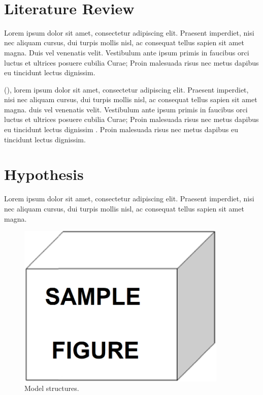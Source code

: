 \vfill\phantom{.}\\

\section{Literature Review}\label{literaturereview}

Lorem ipsum dolor sit amet, consectetur adipiscing elit. Praesent imperdiet, nisi nec aliquam cursus, dui turpis mollis nisl, ac consequat tellus sapien sit amet magna. Duis vel venenatis velit. Vestibulum ante ipsum primis in faucibus orci luctus et ultrices posuere cubilia Curae; Proin malesuada risus nec metus dapibus eu tincidunt lectus dignissim. 

\citeauthor{HYP:HYP57} (\citeyear{HYP:HYP57}), lorem ipsum dolor sit amet, consectetur adipiscing elit. Praesent imperdiet, nisi 
nec aliquam cursus, dui turpis mollis nisl, ac consequat tellus sapien sit amet 
magna. \citet{Box:1990:TSA:574978} duis vel venenatis velit. Vestibulum ante ipsum primis in faucibus orci 
luctus et ultrices posuere cubilia Curae; Proin malesuada risus nec metus dapibus 
eu tincidunt lectus dignissim \citep{17590413}. Proin malesuada risus nec metus dapibus 
eu tincidunt lectus dignissim. 

\section{Hypothesis}

Lorem ipsum dolor sit amet, consectetur adipiscing elit. Praesent imperdiet, nisi 
nec aliquam cursus, dui turpis mollis nisl, ac consequat tellus sapien sit amet 
magna.

\vspace{6pt}
\begin{figure}[h!]
    \centering
    \includegraphics[width=10cm,keepaspectratio=true]{./fig/sekil1}
    \caption{Model structures.}
    \label{fig:ch1-1}
\end{figure}
\vspace{-6pt}

